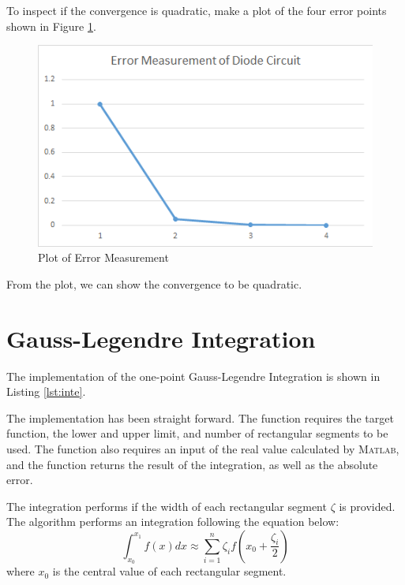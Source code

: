 \documentclass[a4paper,titlepage]{article}
\newcommand{\MATLAB}{\textsc{Matlab}\xspace}
\begin{document}
			To inspect if the convergence is quadratic, make a plot of the four error points shown in Figure \ref{err_measure}.
			\begin{figure}[!h]
				\centering
				\includegraphics[width=\linewidth]{../data/diode_err}
				\caption{Plot of Error Measurement}
				\label{err_measure}
			\end{figure}
		
			From the plot, we can show the convergence to be quadratic. 
			
	\section{Gauss-Legendre Integration}
		The implementation of the one-point Gauss-Legendre Integration is shown in Listing \ref{lst:inte}.
		
		The implementation has been straight forward. The function requires the target function, the lower and upper limit, and number of rectangular segments to be used. The function also requires an input of the real value calculated by \MATLAB, and the function returns the result of the integration, as well as the absolute error. 
		
		The integration performs if the width of each rectangular segment $\zeta$ is provided. The algorithm performs an integration following the equation below:
		\begin{equation}
			\int_{x_0}^{x_1}f(x)dx \approx \sum_{i = 1}^{n} \zeta_i f(x_0 + \frac{\zeta_i}{2})
		\end{equation}
		where $x_0$ is the central value of each rectangular segment. 
		
\end{document}
